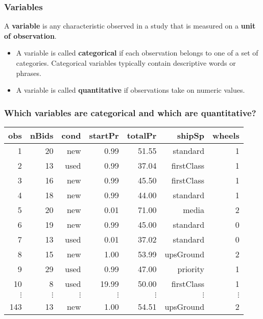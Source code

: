 \begin{frame}
\frametitle{Variables}
A \textbf{variable} is any characteristic observed in a study that is measured on a \textbf{unit of observation}.
\begin{itemize}
    \item
    A variable is called \textbf{categorical} if each observation belongs to one of a set of categories.  Categorical variables typically contain descriptive words or phrases.
    \item
    A variable is called \textbf{quantitative} if observations take on numeric values.
\end{itemize}
\end{frame}

\begin{frame}
\frametitle{Which variables are categorical and which are quantitative?}
\begin{tabular}{rrrrrrr}
    \hline
    obs & nBids & cond & startPr & totalPr & shipSp & wheels \\
    \hline\hline
    1  &    20 & new  &  0.99 &  51.55 &  standard  &    1 \\
    2  &    13 & used &  0.99 &  37.04 & firstClass &    1 \\
    3  &    16 & new  &  0.99 &  45.50 & firstClass &    1 \\
    4  &    18 & new  &  0.99 &  44.00 &  standard  &    1 \\
    5  &    20 & new  &  0.01 &  71.00 &     media  &    2 \\
    6  &    19 & new  &  0.99 &  45.00 &  standard  &    0 \\
    7  &    13 & used &  0.01 &  37.02 &  standard  &    0 \\
    8  &    15 & new  &  1.00 &  53.99 & upsGround  &    2 \\
    9  &    29 & used &  0.99 &  47.00 &  priority  &    1 \\
    10 &     8 & used & 19.99 &  50.00 & firstClass &    1 \\
    $\vdots$ & $\vdots$ & $\vdots$ & $\vdots$ & $\vdots$ & $\vdots$ & $\vdots$\\
    143 &   13 & new &   1.00 &  54.51 &  upsGround    &  2 \\
    \hline
\end{tabular}%
\end{frame}


